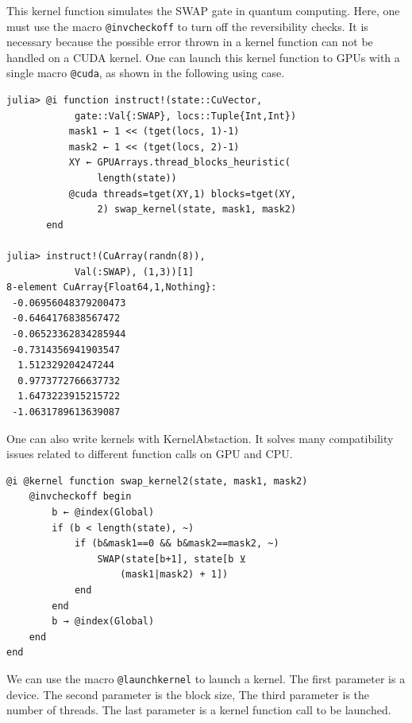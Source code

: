 \documentclass[aps,twocolumn,longbibliography,english,superscriptaddress]{revtex4-1}
\newcommand{\<}{\langle}
\renewcommand{\>}{\rangle}
\theoremstyle{definition}\newtheorem{definition}{\textit{Definition}}
\begin{document}
This kernel function simulates the SWAP gate in quantum computing.
Here, one must use the macro \texttt{@invcheckoff} to turn off the reversibility checks. It is necessary because the possible error thrown in a kernel function can not be handled on a CUDA kernel.
One can launch this kernel function to GPUs with a single macro \texttt{@cuda}, as shown in the following using case.

\begin{minipage}{.44\textwidth}
\begin{lstlisting}
julia> @i function instruct!(state::CuVector,
            gate::Val{:SWAP}, locs::Tuple{Int,Int})
           mask1 ← 1 << (tget(locs, 1)-1)
           mask2 ← 1 << (tget(locs, 2)-1)
           XY ← GPUArrays.thread_blocks_heuristic(
                length(state))
           @cuda threads=tget(XY,1) blocks=tget(XY,
                2) swap_kernel(state, mask1, mask2)
       end

julia> instruct!(CuArray(randn(8)),
            Val(:SWAP), (1,3))[1]
8-element CuArray{Float64,1,Nothing}:
 -0.06956048379200473
 -0.6464176838567472
 -0.06523362834285944
 -0.7314356941903547
  1.512329204247244
  0.9773772766637732
  1.6473223915215722
 -1.0631789613639087
\end{lstlisting}
\end{minipage}

One can also write kernels with KernelAbstaction. It solves many compatibility issues related to different function calls on GPU and CPU.


\begin{minipage}{.44\textwidth}
\begin{lstlisting}
@i @kernel function swap_kernel2(state, mask1, mask2)
    @invcheckoff begin
        b ← @index(Global)
        if (b < length(state), ~)
            if (b&mask1==0 && b&mask2==mask2, ~)
                SWAP(state[b+1], state[b ⊻ 
                    (mask1|mask2) + 1])
            end
        end
        b → @index(Global)
    end
end
\end{lstlisting}
\end{minipage}

We can use the macro \texttt{@launchkernel} to launch a kernel.
The first parameter is a device.
The second parameter is the block size,
The third parameter is the number of threads.
The last parameter is a kernel function call to be launched.
\end{document}
